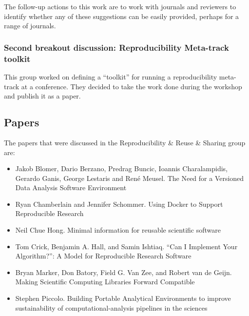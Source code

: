 \documentclass[11pt, oneside]{amsart}
\begin{document}
The follow-up actions to this work are to work with journals and reviewers to
identify whether any of these suggestions can be easily provided, perhaps for a
range of journals.

\subsubsection{Second breakout discussion: Reproducibility Meta-track toolkit}

This group worked on defining a ``toolkit'' for running a reproducibility
meta-track at a conference. They decided to take the work done during the
workshop and publish it as a paper.



\subsection{Papers}
The papers that were discussed in the Reproducibility \& Reuse \& Sharing group are:
\begin{itemize}
\item Jakob Blomer, Dario Berzano, Predrag Buncic, Ioannis Charalampidis,
Gerardo Ganis, George Lestaris and Ren\'{e} Meusel. The Need for a Versioned
Data Analysis Software Environment~\cite{wssspe2_blomer}

\item Ryan Chamberlain and Jennifer Schommer. Using {Docker} to Support
Reproducible Research~\cite{wssspe2_chamberlain}

\item Neil Chue Hong. Minimal information for reusable scientific
software~\cite{wssspe2_chue_hong}

\item Tom Crick, Benjamin A. Hall, and Samin Ishtiaq. ``Can I Implement Your
Algorithm?'': A Model for Reproducible Research Software~\cite{wssspe2_crick}

\item Bryan Marker, Don Batory, Field G. Van Zee, and Robert van de Geijn. Making
Scientific Computing Libraries Forward Compatible~\cite{wssspe2_marker}

\item Stephen Piccolo. Building Portable Analytical Environments to improve
sustainability of computational-analysis pipelines in the
sciences~\cite{wssspe2_piccolo}
\end{itemize}
\end{document}
